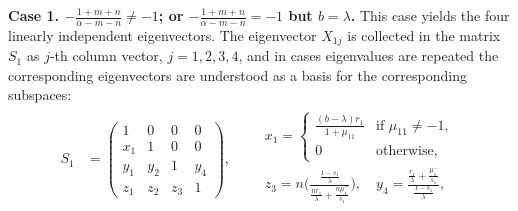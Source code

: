 \documentclass[a4paper,11pt]{article}
\theoremstyle{remark}
\begin{document}
{\bf Case 1. $-\frac{1+m+n}{\alpha-m-n}\ne -1$; or $-\frac{1+m+n}{\alpha-m-n}= -1$ but $b=\lambda$. } This case yields the four linearly independent eigenvectors. The eigenvector $X_{1j}$ is collected in the matrix $S_1$ as $j$-th column vector, $j=1,2,3,4$, and in cases eigenvalues are repeated the corresponding eigenvectors are understood as a basis for the corresponding subspaces:
\begin{align*}
 S_1&=
 \begin{pmatrix}
    1 & 0 & 0 & 0\\
    x_1 & 1 & 0 & 0\\
    y_1 & y_2 & 1 & y_4\\
    z_1 & z_2 & z_3 &1
 \end{pmatrix}, \quad \quad
 \begin{array}{l}
  x_1=
 \begin{cases}
  \frac{(b-\lambda)r_1}{1+\mu_{11}} & \text{if $\mu_{11}\ne -1$,}\\
  0 & \text{otherwise,}
 \end{cases}\\
 z_3=n\bigg(\frac{\frac{1-s_1}{\lambda}}{\frac{n r_1}{\lambda} + \frac{n\mu_{1}^+}{s_1}}\bigg), \quad y_4=\frac{\frac{r_1}{\lambda}+\frac{\mu_1^-}{s_1}}{\frac{1-s_1}{\lambda}},\\
 \end{array}
\end{align*}
\end{document}
